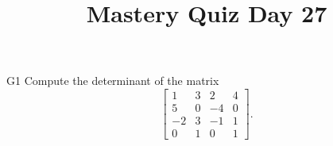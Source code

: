 \documentclass{sbgLAquiz}
\title{Mastery Quiz Day 27 }
\begin{document}
\begin{problem}{G1}
Compute the determinant of the matrix
\[
  \begin{bmatrix}
    1 & 3 & 2 & 4 \\
    5 & 0 & -4 & 0 \\
    -2 & 3 & -1 & 1 \\
    0 & 1 & 0 & 1
  \end{bmatrix}
.\]
\end{problem}
\end{document}
